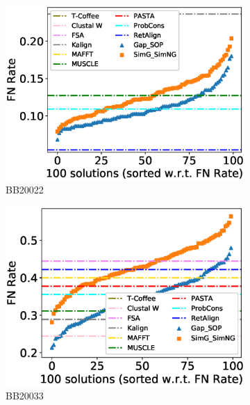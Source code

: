 \begin{figure}[!htbp]
\begin{adjustwidth}{-1.5cm}{-1cm}
		\begin{subfigure}{0.22\textwidth}
			\includegraphics[width=\columnwidth]{Figure/summary/precomputedInit/Balibase/BB20022_fnrate_density_single_run}
			\caption{BB20022}
		\end{subfigure}
		\begin{subfigure}{0.22\textwidth}
			\includegraphics[width=\columnwidth]{Figure/summary/precomputedInit/Balibase/BB20033_fnrate_density_single_run}
			\caption{BB20033}
		\end{subfigure}
		\begin{subfigure}{0.22\textwidth}

\end{subfigure}
\end{adjustwidth}
\end{figure}
